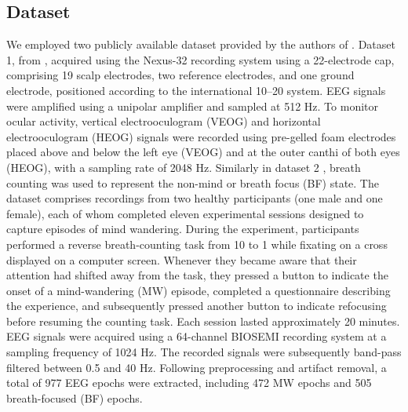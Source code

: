 \documentclass[conference]{IEEEtran}
\begin{document}
\subsection{Dataset}
We employed two publicly available dataset provided by the authors of \cite{grandchamp2014oculometric,rodlarios}.  Dataset 1, from \cite{rodlarios}, acquired using the Nexus-32 recording system using a 22-electrode cap, comprising 19 scalp electrodes, two reference electrodes, and one ground electrode, positioned according to the international 10–20 system. EEG signals were amplified using a unipolar amplifier and sampled at 512 Hz. To monitor ocular activity, vertical electrooculogram (VEOG) and horizontal electrooculogram (HEOG) signals were recorded using pre-gelled foam electrodes placed above and below the left eye (VEOG) and at the outer canthi of both eyes (HEOG), with a sampling rate of 2048 Hz. 
Similarly  in dataset 2 \cite{grandchamp2014oculometric}, breath counting was used to represent the non-mind or breath focus (BF) state. The dataset comprises recordings from two healthy participants (one male and one female), each of whom completed eleven experimental sessions designed to capture episodes of mind wandering.
During the experiment, participants performed a reverse breath-counting task from 10 to 1 while fixating on a cross displayed on a computer screen. Whenever they became aware that their attention had shifted away from the task, they pressed a button to indicate the onset of a mind-wandering (MW) episode, completed a questionnaire describing the experience, and subsequently pressed another button to indicate refocusing before resuming the counting task. Each session lasted approximately 20 minutes.
EEG signals were acquired using a 64-channel BIOSEMI recording system at a sampling frequency of 1024 Hz. The recorded signals were subsequently band-pass filtered between 0.5 and 40 Hz. Following preprocessing and artifact removal, a total of 977 EEG epochs were extracted, including 472 MW epochs and 505 breath-focused (BF) epochs.
\end{document}
